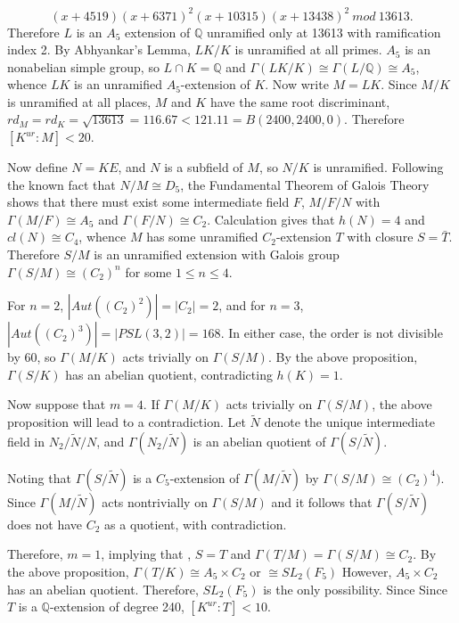 \documentclass[12pt]{extarticle}
\newcommand{\Q}{\mathbb{Q}}
\newcommand{\<}{\langle}
\renewcommand{\>}{\rangle}
\theoremstyle{definition}
\begin{document}
\begin{equation}
(x+4519)(x+6371)^2(x+10315)(x+13438)^2 \: mod \: 13613.
\end{equation}
Therefore $L$ is an $A_5$ extension of $\Q$ unramified only at 13613 with ramification index 2. By Abhyankar's Lemma, $LK/K$ is unramified at all primes. $A_5$ is an nonabelian simple group, so $L \cap K = \Q$ and $\Gamma(LK/K) \cong \Gamma(L/\Q) \cong A_5$, whence $LK$ is an unramified $A_5$-extension of $K$.
Now write $M=LK$. Since $M/K$ is unramified at all places, $M$ and $K$ have the same root discriminant, $rd_M = rd_K = \sqrt{13613} = 116.67 < 121.11 = B(2400,2400,0)$. Therefore $[K^{ur}:M]<20$. \par
Now define $N=KE$, and $N$ is a subfield of $M$, so $N/K$ is unramified. Following the known fact that $N/M \cong D_5$, the Fundamental Theorem of Galois Theory shows that there must exist some intermediate field $F$, $M/F/N$ with $\Gamma(M/F) \cong A_5$ and $\Gamma(F/N) \cong C_2$. Calculation gives that $h(N)=4$ and $cl(N) \cong C_4$, whence $M$ has some unramified $C_2$-extension $T$ with closure $S = \bar{T}$. Therefore $S/M$ is an unramified extension with Galois group $\Gamma(S/M) \cong \left(C_2 \right)^{n}$ for some $1 \leq n \leq 4$. \par
For $n=2$, $|Aut((C_2)^2)| = |C_2| = 2$, and for $n=3$, $|Aut((C_2)^3)| = |PSL(3,2)| = 168$. In either case, the order is not divisible by 60, so $\Gamma(M/K)$ acts trivially on $\Gamma(S/M)$. By the above proposition, $\Gamma(S/K)$ has an abelian quotient, contradicting $h(K)=1$. \par
Now suppose that $m=4$. 
If $\Gamma(M/K)$ acts trivially on $\Gamma(S/M)$, the above proposition will lead to a contradiction. Let $\tilde{N}$ denote the unique intermediate field in $N_2/\tilde{N}/N$, and $\Gamma(N_2/\tilde{N})$ is an abelian quotient of $\Gamma(S/\tilde{N})$. \par 
Noting that  $\Gamma(S/\tilde{N})$ is a $C_5$-extension of
$\Gamma(M/\tilde{N})$ by $\Gamma(S/M) \cong (C_2)^{4})$. Since 
$\Gamma(M/\tilde{N})$ acts nontrivially on $\Gamma(S/M)$
 and it follows that  $\Gamma(S/\tilde{N})$ does not have $C_2$ as a quotient, with contradiction. \par
Therefore, $m = 1$, implying that , $S=T$ and $\Gamma(T/M) = \Gamma(S/M) \cong C_2$. By the above proposition, $\Gamma(T/K) \cong A_5 \times C_2$  or $\cong SL_2(F_5)$ However, $A_5 \times C_2$ has an abelian quotient. Therefore,  $SL_2(F_5)$ is the only possibility. Since Since $T$ is a $\Q$-extension of degree 240, $[K^{ur}:T] < 10$. 
\end{document}
